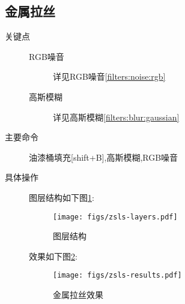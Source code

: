 \subsection{金属拉丝}\label{yl:zsls}
\begin{description}
\item[关键点] 
\begin{description}
\item[RGB噪音] 详见RGB噪音\ref{filters:noise:rgb}
\item[高斯模糊] 详见高斯模糊\ref{filters:blur:gaussian}
\end{description}
\item[主要命令] 油漆桶填充[shift+B],高斯模糊,RGB噪音
\item[具体操作]
图层结构如下图\ref{yl:zsls:layers}:
\begin{figure}[!htbp]
	\centering
	\caption{图层结构}
    	\texttt{[image: figs/zsls-layers.pdf]}
    	\label{yl:zsls:layers}
\end{figure}
效果如下图\ref{yl:zsls:results}:
\begin{figure}[!htbp]
	\centering
	\caption{金属拉丝效果}
    	\texttt{[image: figs/zsls-results.pdf]}
    	\label{yl:zsls:results}
\end{figure}
\end{description}





\clearpage